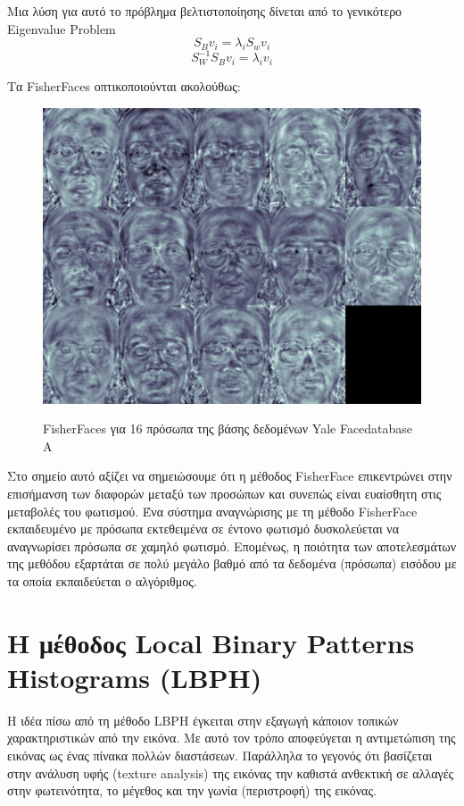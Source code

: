 Μια λύση για αυτό το πρόβλημα βελτιστοποίησης δίνεται από το γενικότερο Eigenvalue
Problem ~\cite{behekri97}
$$
S_{B}v_i = \lambda_{i}S_{w}v_i
$$
$$
S_{W}^{-1}S_{B}v_i = \lambda_{i}v_i
$$

Τα FisherFaces οπτικοποιούνται ακολούθως:


\begin{figure}[htbp]
  \begin{center}
    \includegraphics[width=0.5\maxwidth]{../figures/fisherfaces.png}
      \caption{FisherFaces για 16 πρόσωπα της βάσης δεδομένων Yale Facedatabase A}
      \label{fig:fisherfaces}
   \end{center}
\end{figure}

Στο σημείο αυτό αξίζει να σημειώσουμε ότι η μέθοδος FisherFace επικεντρώνει στην
επισήμανση των διαφορών μεταξύ των προσώπων και συνεπώς είναι ευαίσθητη στις μεταβολές
του φωτισμού. Ένα σύστημα αναγνώρισης με τη μέθοδο FisherFace εκπαιδευμένο με πρόσωπα
εκτεθειμένα σε έντονο φωτισμό δυσκολεύεται να αναγνωρίσει πρόσωπα σε χαμηλό φωτισμό.
Επομένως, η ποιότητα των αποτελεσμάτων της μεθόδου εξαρτάται σε πολύ μεγάλο βαθμό
από τα δεδομένα (πρόσωπα) εισόδου με τα οποία εκπαιδεύεται ο αλγόριθμος.


\section{H μέθοδος Local Binary Patterns Histograms (LBPH)}\label{sec:lbph}

Η ιδέα πίσω από τη μέθοδο LBPH έγκειται στην εξαγωγή κάποιον τοπικών χαρακτηριστικών
από την εικόνα. Με αυτό τον τρόπο αποφεύγεται η αντιμετώπιση της εικόνας ως ένας πίνακα πολλών
διαστάσεων. Παράλληλα το γεγονός ότι βασίζεται στην ανάλυση υφής (texture analysis)
της εικόνας την καθιστά ανθεκτική σε αλλαγές στην φωτεινότητα, το μέγεθος και την
γωνία (περιστροφή) της εικόνας.

